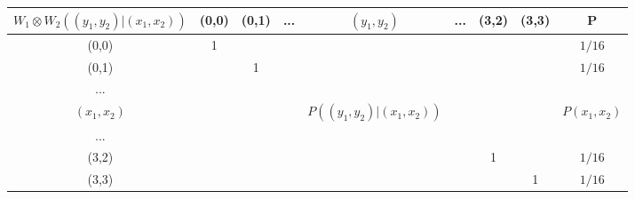 \begin{tabular}{c|c|c|c|c|c|c|c||c|}
$W_1 \otimes W_2((y_1,y_2)|(x_1, x_2))$ & (0,0) & (0,1) & ... & $(y_1, y_2)$             & ... & (3,2) & (3,3) & P         \\ \hline
(0,0)             & 1     &       &     &                          &     &       &       & $1/16$  \\ \hline
(0,1)             &       & 1     &     &                          &     &       &       & $1/16$  \\ \hline
...               &       &       &     &                          &     &       &       &           \\ \hline
$(x_1, x_2)$      &       &       &     & $P((y_1,y_2)|(x_1,x_2))$ &     &       &       & $P(x_1, x_2)$ \\ \hline
...               &       &       &     &                          &     &       &       &           \\ \hline
(3,2)             &       &       &     &                          &     & 1     &       & $1/16$  \\ \hline
(3,3)             &       &       &     &                          &     &       & 1     & $1/16$  \\ \hline
\end{tabular}